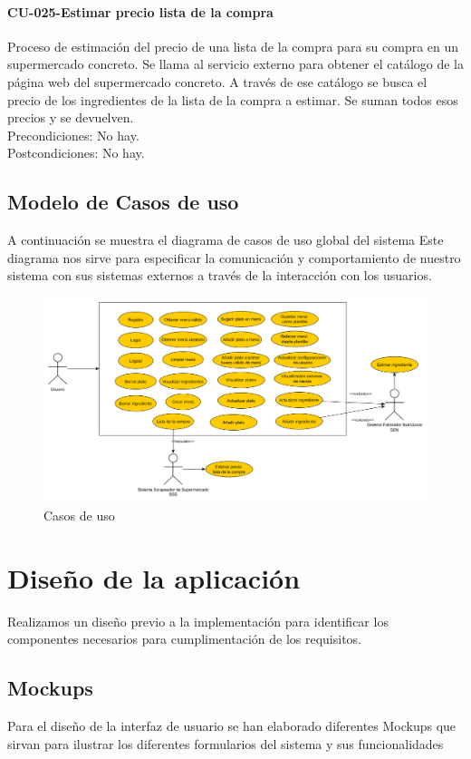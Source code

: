 \documentclass[12pt, a4paper, twoside]{book}
\begin{document}
	\subsubsection{CU-025-Estimar precio lista de la compra}
	Proceso de estimación del precio de una lista de la compra para su compra en un supermercado concreto.
	Se llama al servicio externo para obtener el catálogo de la página web del supermercado concreto.
	A través de ese catálogo se busca el precio de los ingredientes de la lista de la compra a estimar.
	Se suman todos esos precios y se devuelven.\\
	Precondiciones: No hay.\\
	Postcondiciones: No hay.
	\section{Modelo de Casos de uso}
	A continuación se muestra el diagrama de casos de uso global del sistema
	Este diagrama nos sirve para especificar la comunicación y comportamiento de nuestro sistema con sus sistemas externos a través de la interacción con los usuarios.
	\begin{figure}[H]
		\centering
		\includegraphics[width=15cm]{Imagenes/CasosUso.png}
		\caption{Casos de uso}\label{Casos de uso}
	\end{figure}
	\chapter{Diseño de la aplicación}
	Realizamos un diseño previo a la implementación para identificar los componentes necesarios para cumplimentación de los requisitos.	
	\section{Mockups}
	Para el diseño de la interfaz de usuario se han elaborado diferentes Mockups que sirvan para ilustrar los diferentes formularios del sistema y sus funcionalidades
\end{document}

